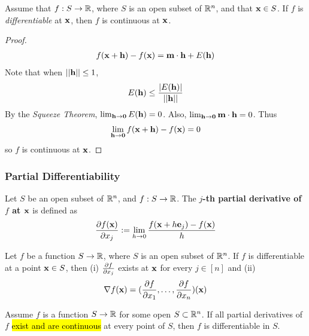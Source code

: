 \documentclass[11pt]{article}
\newcommand{\vex}[0]{\ve{x}}
\begin{document}
				\begin{theorem}
					Assume that $f: S \to \mathbb{R}$, where $S$ is an open subset of $\mathbb{R}^n$, and that $\vex \in S$. If $f$ is \emph{differentiable} at $\vex$, then $f$ is continuous at $\vex$.
					\begin{proof}
						\begin{gather}
							f(\vex + \ve{h}) - f(\vex) = \ve{m} \cdot \ve{h} + E(\ve{h})
						\end{gather}
						Note that when $\vert \vert {\textbf{h}} \vert \vert \leq 1$,
						\begin{gather}
							E(\textbf{h}) \leq \frac{|E(\textbf{h})|}{\vert \vert {\textbf{h}} \vert \vert}
						\end{gather}
						By the \emph{Squeeze Theorem}, $\lim_{\textbf{h} \to \textbf{0}} E(\textbf{h}) = 0$. Also, $\lim_{\textbf{h} \to \textbf{0}} \textbf{m} \cdot \textbf{h} = 0$. Thus 
						\begin{gather}
							\lim_{\ve{h} \to \ve{0}} f(\vex + \ve{h}) - f(\vex) = 0
						\end{gather}
						so $f$ is continuous at $\vex$.
					\end{proof}
				\end{theorem}
				
			\subsubsection{Partial Differentiability}
				\begin{definition}
					Let $S$ be an open subset of $\mathbb{R}^n$, and $f: S \to \mathbb{R}$. The \textbf{$j$-th partial derivative of $f$ at $\vex$} is defined as 
					\begin{equation}
						\pd{f(\vex)}{x_j} := \lim_{h \to 0} \frac{f(\vex + h \ve{e}_j) - f(\vex)}{h}
					\end{equation}
				\end{definition}
				
				\begin{theorem}
					Let $f$ be a function $S \to \mathbb{R}$, where $S$ is an open subset of $\mathbb{R}^n$. If $f$ is differentiable at a point $\vex \in S$, then (i) $\frac{\partial{f}}{\partial{x_j}}$ exists at $\vex$ for every $j \in [n]$ and (ii) 
					\begin{equation}
						\nabla f(\vex) = (\pd{f}{x_1}, \dots, \pd{f}{x_n})(\vex)
					\end{equation}
				\end{theorem}
				
				\begin{theorem}
					Assume $f$ is a function $S \to \mathbb{R}$ for some open $S \subset \mathbb{R}^n$. If all partial derivatives of $f$ \hl{exist and are continuous} at every point of $S$, then $f$ is differentiable in $S$.
				\end{theorem}
				
\end{document}

